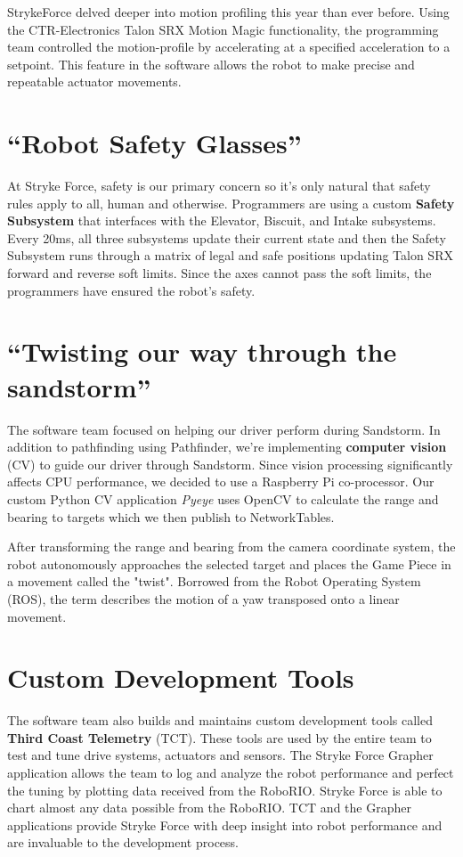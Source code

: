 \documentclass[10pt,tumble]{leaflet}
\begin{document}
StrykeForce delved deeper into motion profiling this year than ever before.  Using the CTR-Electronics Talon SRX Motion Magic functionality, the programming team controlled the motion-profile by accelerating at a specified acceleration to a setpoint.  This feature in the software allows the robot to make precise and repeatable actuator movements.

\section{``Robot Safety Glasses''}

At Stryke Force, safety is our primary concern so it's only natural that safety rules apply to all, human and otherwise. Programmers are using a custom \textbf{Safety Subsystem} that interfaces with the Elevator, Biscuit, and Intake subsystems. Every 20ms, all three subsystems update their current state and then the Safety Subsystem runs through a matrix of legal and safe positions updating Talon SRX forward and reverse soft limits. Since the axes cannot pass the soft limits, the programmers have ensured the robot's safety.

\section{``Twisting our way through the sandstorm''}

The software team focused on helping our driver perform during Sandstorm. In addition to pathfinding using Pathfinder, we're implementing \textbf{computer vision} (CV) to guide our driver through Sandstorm. Since vision processing significantly affects CPU performance, we decided to use a Raspberry Pi co-processor. Our custom Python CV application \textit{Pyeye} uses OpenCV to calculate the range and bearing to targets which we then publish to NetworkTables.

After transforming the range and bearing from the camera coordinate system, the robot autonomously approaches the selected target and places the Game Piece in a movement called the "twist". Borrowed from the Robot Operating System (ROS), the term describes the motion of a yaw transposed onto a linear movement.

\section{Custom Development Tools}

The software team also builds and maintains custom development tools called \textbf{Third Coast Telemetry} (TCT).  These tools are used by the entire team to test and tune drive systems, actuators and sensors. The Stryke Force Grapher application allows the team to log and analyze the robot performance and perfect the tuning by plotting data received from the RoboRIO.  Stryke Force is able to chart almost any data possible from the RoboRIO.  TCT and the Grapher applications provide Stryke Force with deep insight into robot performance and are invaluable to the development process.
\end{document}
